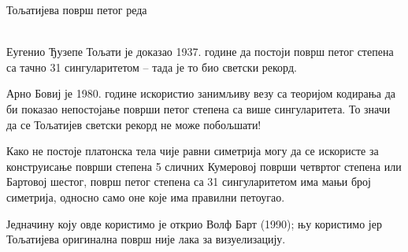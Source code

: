 \documentclass[sr]{./../../common/SurferDesc}%
\begin{document}
\footnotesize


\begin{surferPage}
  \begin{surferTitle}Тољатијева површ петог реда\end{surferTitle}  \\

    Еугенио Ђузепе Тољати је доказао 1937. године да постоји површ петог степена са тачно 
	31 сингуларитетом – тада је то био светски рекорд.


    Арно Бовиј је 1980. године искористио занимљиву везу са теоријом кодирања да би 
	показао непостојање површи петог степена са више сингуларитета. 
    То значи да се Тољатијев светски рекорд не може побољшати!

    Како не постоје платонска тела чије равни симетрија могу да се искористе за 
	конструисање површи степена 5 сличних Кумеровој површи четвртог степена или 
	Бартовој шестог, површ петог степена са 31 сингуларитетом има мањи број симетрија, 
	односно само оне које има правилни петоугао.


 Једначину коју овде користимо је открио Волф Барт (1990); њу користимо јер 
 Тољатијева оригинална површ није лака за визуелизацију.




  \begin{surferText}
     \end{surferText}
\end{surferPage}
\end{document}
